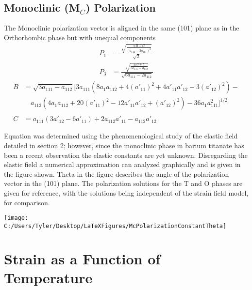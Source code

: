\documentclass{article}
\begin{document}
\subsection{Monoclinic (M$_C$) Polarization}
The Monoclinic polarization vector is aligned in the same (101) plane as in the Orthorhombic phase but with unequal components
\begin{align}
P_1 &= \frac{\sqrt{\frac{\mp{B}+C}{\left(a_{112}-3 a_{111}\right)^2}}}{\sqrt{2}} \\
P_3 &= \frac{\sqrt{\frac{\pm{B}+C}{3 a_{111}-a_{112}}}}{\sqrt{6 a_{111}-2 a_{112}}}
\end{align}
\begin{align}
          B &= \sqrt{3 a_{111}-a_{112}} [3 a_{111} \left(8 a_1 a_{112}+4 (a'_{11})^2+4a'_{11} a'_{12}-3 (a'_{12})^2\right)- \\ 
           & \quad a_{112} \left(4 a_1 a_{112}+20 (a'_{11})^2-12 a'_{11} a'_{12}+(a'_{12})^2\right)-36 a_1 a_{111}^2]^{1/2} \nonumber \\
           \nonumber \\
           C &= a_{111} (3 a'_{12}-6 a'_{11})+2 a_{112} a'_{11}-a_{112} a'_{12}
\end{align}

Equation  was determined using the phenomenological study of the elastic field detailed in section 2; however, since the monoclinic phase in barium titanate has been a recent observation the elastic constants are yet unknown.  Disregarding the elastic field a numerical approximation can analyzed graphically and is given in the figure shown.  Theta in the figure describes the angle of the polarization vector in the (101) plane.  The polarization solutions for the T and O phases are given for reference, with the solutions being independent of the strain field model, for comparison.

\texttt{[image: C:/Users/Tyler/Desktop/LaTeXFigures/McPolarizationConstantTheta]}


\newpage
\section{Strain as a Function of Temperature}
\end{document}

